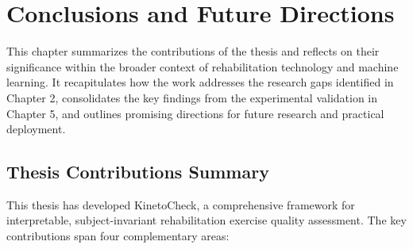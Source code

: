 \chapter{Conclusions and Future Directions}
\label{chap:conclusions}

This chapter summarizes the contributions of the thesis and reflects on their significance within the broader context of rehabilitation technology and machine learning. It recapitulates how the work addresses the research gaps identified in Chapter 2, consolidates the key findings from the experimental validation in Chapter 5, and outlines promising directions for future research and practical deployment.

\section{Thesis Contributions Summary}
This thesis has developed KinetoCheck, a comprehensive framework for interpretable, subject-invariant rehabilitation exercise quality assessment. The key contributions span four complementary areas:

